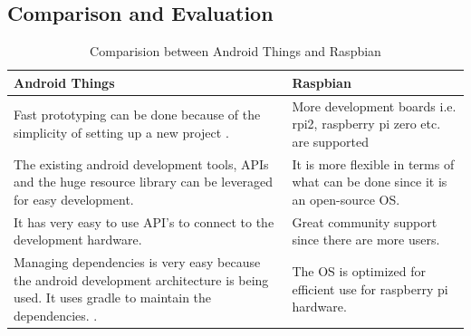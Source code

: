         
        \newpage
        \subsection{Comparison and Evaluation} 
            \label{ssec:OsComparison}  
            \begin{table}[h!]
                \centering
                \begin{tabular}{|p{9cm}|p{7.5cm}|}
                    \hline
                        \textbf{Android Things}  & \textbf{Raspbian}\\
                    \hline
                        Fast prototyping can be done because of the simplicity of setting
                        up a new project 
                        \cite{GoogleStart}. & 
                        More development boards i.e. rpi2, raspberry pi zero etc. are supported\\
                    \hline
                        The existing android development tools, APIs and the huge resource library 
                        can be leveraged for easy development.
                        & It is more flexible in terms of what can be done since
                        it is an open-source OS.\\
                    \hline
                        It has very easy to use API's to connect to the development hardware.
                        \cite{GoogleIO} & Great
                        community support since there are more users.\\
                    \hline
                        Managing dependencies is very easy because the android development 
                        architecture is being used. It uses gradle to maintain the dependencies.
                        \cite{Gradle}. & The OS is optimized for efficient use for
                        raspberry pi hardware.\\  
                    \hline
                \end{tabular}
                \caption{Comparision between Android Things and Raspbian}
                \label{table:aThingsVsRaspbian}     
        \end{table}

